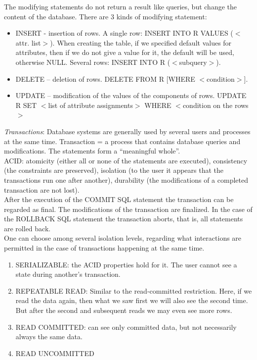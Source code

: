 \documentclass[margin=0px]{article}
\begin{document}
The modifying statements do not return a result like queries, but change the content of the database. There are 3 kinds of modifying statement:
\begin{itemize}
    \item INSERT - insertion of rows. A single row: INSERT INTO R VALUES ($<$attr. list$>$). When creating the table, if we specified default values for attributes, then if we do not give a value for it, the default will be used, otherwise NULL. Several rows: INSERT INTO R ($<$subquery$>$).
    \item DELETE -- deletion of rows. DELETE FROM R [WHERE $<$condition$>$].
    \item UPDATE -- modification of the values of the components of rows. UPDATE R SET $<$list of attribute assignments$>$ WHERE $<$condition on the rows$>$
\end{itemize}
\textit{Transactions}: Database systems are generally used by several users and processes at the same time. Transaction = a process that contains database queries and modifications. The statements form a ``meaningful whole''. \\
ACID: atomicity (either all or none of the statements are executed), consistency (the constraints are preserved), isolation (to the user it appears that the transactions run one after another), durability (the modifications of a completed transaction are not lost). \\
After the execution of the COMMIT SQL statement the transaction can be regarded as final. The modifications of the transaction are finalized. In the case of the ROLLBACK SQL statement the transaction aborts, that is, all statements are rolled back. \\
One can choose among several isolation levels, regarding what interactions are permitted in the case of transactions happening at the same time.
\begin{enumerate}
    \item SERIALIZABLE: the ACID properties hold for it. The user cannot see a state during another's transaction.
    \item REPEATABLE READ: Similar to the read-committed restriction. Here, if we read the data again, then what we saw first we will also see the second time. But after the second and subsequent reads we may even see more rows.
    \item READ COMMITTED: can see only committed data, but not necessarily always the same data.
    \item READ UNCOMMITTED
\end{enumerate}
\end{document}
